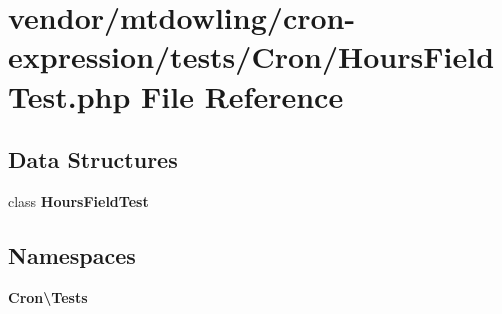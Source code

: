 \section{vendor/mtdowling/cron-\/expression/tests/\+Cron/\+Hours\+Field\+Test.php File Reference}
\label{_hours_field_test_8php}
\subsection*{Data Structures}
\begin{DoxyCompactItemize}
\item 
class {\bf Hours\+Field\+Test}
\end{DoxyCompactItemize}
\subsection*{Namespaces}
\begin{DoxyCompactItemize}
\item 
 {\bf Cron\textbackslash{}\+Tests}
\end{DoxyCompactItemize}
